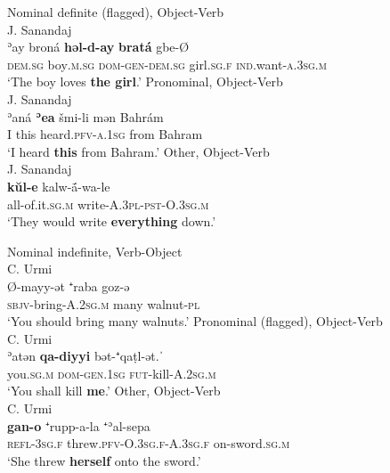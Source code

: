 \documentclass[output=paper,colorlinks,citecolor=brown,draftmode]{langscibook}
\begin{document}
\ea\label{NAINEI:ex:13}
\ea\label{NAINEI:ex:13a}
Nominal definite (flagged), Object-Verb\\
J. Sanandaj \citep[A:\S 18]{Khan2009JSana} \\
\gll ʾay broná \textbf{həl-d-ay} \textbf{bratá} gbe-Ø \\
     \textsc{dem.sg} boy\textsc{.m.sg} \textsc{dom-gen-dem.sg} girl\textsc{.sg.f} \textsc{ind.}want-\textsc{a.3sg.m} \\
\glt `The boy loves \textbf{the girl}.'
\ex\label{NAINEI:ex:13b}
Pronominal, Object-Verb\\
J. Sanandaj \citep[C:\S 3]{Khan2009JSana} \\
\gll ʾaná \textbf{ʾea} šmi-li mən Bahrám \\
     I this heard\textsc{.pfv-a.1sg} from Bahram \\
\glt `I heard \textbf{this} from Bahram.' 
\ex\label{NAINEI:ex:13c}
Other, Object-Verb\\
J. Sanandaj \citep[A:\S 48]{Khan2009JSana} \\
\gll \textbf{kŭl-e} kalw-ā́-wa-le \\
     all-of.it\textsc{.sg.m} write\textsc{-A.3pl-pst-O.3sg.m} \\
\glt `They would write \textbf{everything} down.'
\z
\z

\ea\label{NAINEI:ex:14}
\ea\label{NAINEI:ex:14a}
Nominal indefinite, Verb-Object\\
C. Urmi \citep[A39:\S 42]{Khan2016CUrmi} \\
\gll Ø-mayy-ət ⁺raba goz-ə \\
     \textsc{sbjv-}bring\textsc{-A.2sg.m} many walnut\textsc{-pl} \\
\glt `You should bring many walnuts.'
\ex\label{NAINEI:ex:14b}
Pronominal (flagged), Object-Verb\\
C. Urmi \citep[A2:\S 25]{Khan2016CUrmi} \\
\gll ʾatən \textbf{qa-diyyi} bət-⁺qa\d{t}l-ət.ˈ \\
     you\textsc{.sg.m} \textsc{dom-gen.1sg} \textsc{fut-}kill\textsc{-A.2sg.m} \\
\glt `You shall kill \textbf{me}.'
\ex\label{NAINEI:ex:14c}
Other, Object-Verb\\
C. Urmi \citep[A2:\S 35]{Khan2016CUrmi} \\
\gll \textbf{gan-o} ⁺rupp-a-la ⁺ʾal-sepa \\
     \textsc{refl-3sg.f} threw\textsc{.pfv-O.3sg.f-A.3sg.f} on-sword\textsc{.sg.m} \\
\glt `She threw \textbf{herself} onto the sword.'
\z
\z
\end{document}
